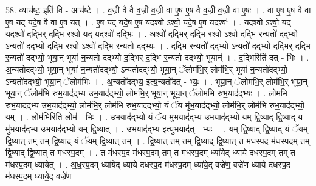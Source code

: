 \documentclass[17pt]{extarticle}
\begin{document}
58. व्याच॑ष्ट॒ इति॑ वि - आच॑ष्टे । . व॒ज्री वै वै व॒ज्री व॒ज्री वा ए॒ष ए॒ष वै व॒ज्री व॒ज्री वा ए॒षः । . वा ए॒ष ए॒ष वै वा ए॒ष यद् यदे॒ष वै वा ए॒ष यत् । . ए॒ष यद् यदे॒ष ए॒ष यदश्वो ऽश्वो॒ यदे॒ष ए॒ष यदश्वः॑ । . यदश्वो ऽश्वो॒ यद् यदश्वो॑ द॒द्भिर् द॒द्भि रश्वो॒ यद् यदश्वो॑ द॒द्भिः । . अश्वो॑ द॒द्भिर् द॒द्भि रश्वो ऽश्वो॑ द॒द्भि र॒न्यतो॑ दद्भ्यो॒ ऽन्यतो॑ दद्भ्यो द॒द्भि रश्वो ऽश्वो॑ द॒द्भि र॒न्यतो॑ दद्भ्यः । . द॒द्भि र॒न्यतो॑ दद्भ्यो॒ ऽन्यतो॑ दद्भ्यो द॒द्भिर् द॒द्भि र॒न्यतो॑ दद्भ्यो॒ भूया॒न् भूया॑ न॒न्यतो॑ दद्भ्यो द॒द्भिर् द॒द्भि र॒न्यतो॑ दद्भ्यो॒ भूयान्॑ । . द॒द्भिरिति॑ दत् - भिः । . अ॒न्यतो॑दद्भ्यो॒ भूया॒न् भूया॑ न॒न्यतो॑दद्भ्यो॒ ऽन्यतो॑दद्भ्यो॒ भूया॒न् ॅलोम॑भि॒र् लोम॑भि॒र् भूया॑ न॒न्यतो॑दद्भ्यो॒ ऽन्यतो॑दद्भ्यो॒ भूया॒न् ॅलोम॑भिः । . अ॒न्यतो॑दद्भ्य॒ इत्य॒न्यतो॑दत् - भ्यः॒ । . भूया॒न् ॅलोम॑भि॒र् लोम॑भि॒र् भूया॒न् भूया॒न् ॅलोम॑भि रुभ॒याद॑द्भ्य उभ॒याद॑द्भ्यो॒ लोम॑भि॒र् भूया॒न् भूया॒न् ॅलोम॑भि रुभ॒याद॑द्भ्यः । . लोम॑भि रुभ॒याद॑द्भ्य उभ॒याद॑द्भ्यो॒ लोम॑भि॒र् लोम॑भि रुभ॒याद॑द्भ्यो॒ यं ॅय मु॑भ॒याद॑द्भ्यो॒ लोम॑भि॒र् लोम॑भि रुभ॒याद॑द्भ्यो॒ यम् । . लोम॑भि॒रिति॒ लोम॑ - भिः॒ । . उ॒भ॒याद॑द्भ्यो॒ यं ॅय मु॑भ॒याद॑द्भ्य उभ॒याद॑द्भ्यो॒ यम् द्वि॒ष्याद् द्वि॒ष्याद् य मु॑भ॒याद॑द्भ्य उभ॒याद॑द्भ्यो॒ यम् द्वि॒ष्यात् । . उ॒भ॒याद॑द्भ्य॒ इत्यु॑भ॒याद॑त् - भ्यः॒ । . यम् द्वि॒ष्याद् द्वि॒ष्याद् यं ॅयम् द्वि॒ष्यात् तम् तम् द्वि॒ष्याद् यं ॅयम् द्वि॒ष्यात् तम् । . द्वि॒ष्यात् तम् तम् द्वि॒ष्याद् द्वि॒ष्यात् त म॑धस्प॒द म॑धस्प॒दम् तम् द्वि॒ष्याद् द्वि॒ष्यात् त म॑धस्प॒दम् । . त म॑धस्प॒द म॑धस्प॒दम् तम् त म॑धस्प॒दम् ध्या॑येद् ध्याये दधस्प॒दम् तम् त म॑धस्प॒दम् ध्या॑येत् । . अ॒ध॒स्प॒दम् ध्या॑येद् ध्याये दधस्प॒द म॑धस्प॒दम् ध्या॑ये॒द् वज्रे॑ण॒ वज्रे॑ण ध्याये दधस्प॒द म॑धस्प॒दम् ध्या॑ये॒द् वज्रे॑ण । \newline
\end{document}
